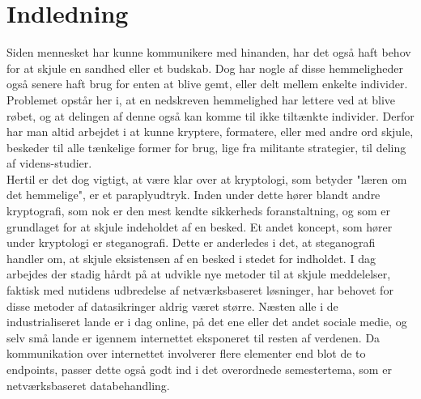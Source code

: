 \section{Indledning}
Siden mennesket har kunne kommunikere med hinanden, har det også haft behov for at skjule en sandhed eller et budskab. \cite{PastCryptography} Dog har nogle af disse hemmeligheder også senere haft brug for enten at blive gemt, eller delt mellem enkelte individer. Problemet opstår her i, at en nedskreven hemmelighed har lettere ved at blive røbet, og at delingen af denne også kan komme til ikke tiltænkte individer.
Derfor har man altid arbejdet i at kunne kryptere, formatere, eller med andre ord skjule, beskeder til alle tænkelige former for brug, lige fra militante strategier, til deling af videns-studier. \cite{The_Invention_of_the_Internet} \\
Hertil er det dog vigtigt, at være klar over at kryptologi, som betyder "læren om det hemmelige", er et paraplyudtryk. Inden under dette hører blandt andre kryptografi, som nok er den mest kendte sikkerheds foranstaltning, og som er grundlaget for at skjule indeholdet af en besked. Et andet koncept, som hører under kryptologi er steganografi. Dette er anderledes i det, at steganografi handler om, at skjule eksistensen af en besked i stedet for indholdet.\cite{MeningOfCryptography} \quad \cite{MeningOfSteganografi}
I dag arbejdes der stadig hårdt på at udvikle nye metoder til at skjule meddelelser, faktisk med nutidens udbredelse af netværksbaseret løsninger, har behovet for disse metoder af datasikringer aldrig været større.\cite{Internetsikkerhed_forlav} Næsten alle i de industrialiseret lande er i dag online, på det ene eller det andet sociale medie, og selv små lande er igennem internettet eksponeret til resten af verdenen. Da kommunikation over internettet involverer flere elementer end blot de to endpoints, passer dette også godt ind i det overordnede semestertema, som er netværksbaseret databehandling.